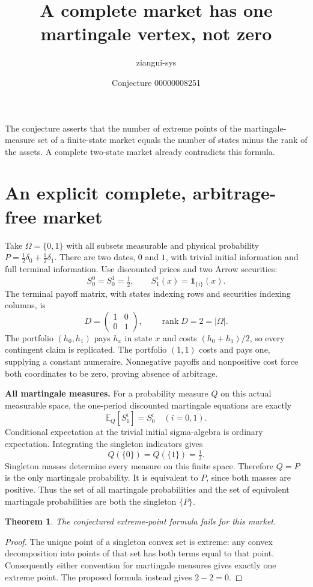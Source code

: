 \documentclass[11pt]{article}
\title{A complete market has one martingale vertex, not zero}
\author{ziangni-sys}
\date{Conjecture 00000008251}
\newtheorem{theorem}{Theorem}
\begin{document}
\sloppy
\maketitle
\noindent The conjecture asserts that the number of extreme points of the
martingale-measure set of a finite-state market equals the number of
states minus the rank of the assets. A complete two-state market already
contradicts this formula.

\section*{An explicit complete, arbitrage-free market}
Take $\Omega=\{0,1\}$ with all subsets measurable and physical probability
$P=\tfrac12\delta_0+\tfrac12\delta_1$. There are two dates, $0$ and $1$,
with trivial initial information and full terminal information. Use
discounted prices and two Arrow securities:
\[
 S_0^0=S_0^1=\tfrac12,\qquad S_1^i(x)=\mathbf1_{\{i\}}(x).
\]
The terminal payoff matrix, with states indexing rows and securities
indexing columns, is
\[
 D=\begin{pmatrix}1&0\\0&1\end{pmatrix},\qquad
 \operatorname{rank}D=2=|\Omega|.
\]
The portfolio $(h_0,h_1)$ pays $h_x$ in state $x$ and costs
$(h_0+h_1)/2$, so every contingent claim is replicated. The portfolio
$(1,1)$ costs and pays one, supplying a constant numeraire.
Nonnegative payoffs and nonpositive cost force both coordinates to be
zero, proving absence of arbitrage.

\medskip
\noindent\textbf{All martingale measures.}
For a probability measure $Q$ on this actual measurable space, the
one-period discounted martingale equations are exactly
\[
 \mathbb E_Q[S_1^i]=S_0^i\quad(i=0,1).
\]
Conditional expectation at the trivial initial sigma-algebra is ordinary
expectation. Integrating the singleton indicators gives
\[
 Q(\{0\})=Q(\{1\})=\tfrac12.
\]
Singleton masses determine every measure on this finite space. Therefore
$Q=P$ is the only martingale probability. It is equivalent to $P$, since
both masses are positive. Thus the set of all martingale probabilities
and the set of equivalent martingale probabilities are both the singleton
$\{P\}$.

\begin{theorem}
The conjectured extreme-point formula fails for this market.
\end{theorem}
\begin{proof}
The unique point of a singleton convex set is extreme: any convex
decomposition into points of that set has both terms equal to that point.
Consequently either convention for martingale measures gives exactly one
extreme point. The proposed formula instead gives $2-2=0$.
\end{proof}
\end{document}
